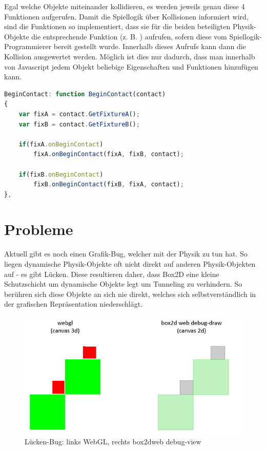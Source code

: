 Egal welche Objekte miteinander kollidieren, es werden jeweils genau diese 4 Funktionen aufgerufen. Damit die Spiellogik über Kollisionen informiert wird, sind die Funktionen so implementiert, dass sie für die beiden beteiligten Physik-Objekte die entsprechende Funktion (z. B. ) aufrufen, sofern diese vom Spiellogik-Programmierer bereit gestellt wurde. Innerhalb dieses Aufrufs kann dann die Kollision ausgewertet werden. Möglich ist dies nur dadurch, dass man innerhalb von Javascript jedem Objekt beliebige Eigenschaften und Funktionen hinzufügen kann.

\begin{lstlisting}[language=JavaScript, caption=\textprog{BeginContact}-Methode des von mir bereitgestellten ContactListeners]
BeginContact: function BeginContact(contact)
{
	var fixA = contact.GetFixtureA();
	var fixB = contact.GetFixtureB();
	
	if(fixA.onBeginContact)
		fixA.onBeginContact(fixA, fixB, contact);
		
	if(fixB.onBeginContact)
		fixB.onBeginContact(fixB, fixA, contact);
},
\end{lstlisting}

\section{Probleme}

Aktuell gibt es noch einen Grafik-Bug, welcher mit der Physik zu tun hat. So liegen dynamische Physik-Objekte oft nicht direkt auf anderen Physik-Objekten auf - es gibt Lücken. Diese resultieren daher, dass Box2D eine kleine Schutzschicht um dynamische Objekte legt um Tunneling zu verhindern. So berühren sich diese Objekte an sich nie direkt, welches sich selbstverständlich in der grafischen Repräsentation niederschlägt.

\begin{figure}[h] %
	\centering
		\includegraphics[scale=0.6]{images/gap_bug.jpg}
	\caption{Lücken-Bug: links WebGL, rechts box2dweb debug-view}
\end{figure}

